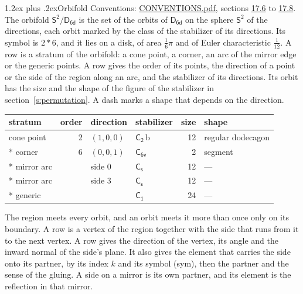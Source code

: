 \documentclass[10pt,a4paper]{article}
\makeatletter
\renewcommand\section{\@startsection{section}{1}{\z@}{-3ex plus -1ex minus -.2ex}%
  {1.2ex plus .2ex}{\normalfont\large\sffamily\bfseries\color{parttitle}}}
\numberwithin{equation}{section}
\newcommand{\grp}[1]{\mathsf{#1}}
\newcommand{\orbname}[1]{#1}
\newcommand{\clsletter}[1]{\,{\scriptsize\color{black!55}#1}}
\newcommand{\dirvec}[3]{(#1, #2, #3)}
\newcommand{\twosphere}{\mathsf{S}^{2}}
\makeatother
\begin{document}
\section{Orbifold}\label{s:orbifold}
Conventions: \href{../../CONVENTIONS.pdf}{CONVENTIONS.pdf}, sections \href{../../CONVENTIONS.pdf\#conv.17.6}{17.6} to \href{../../CONVENTIONS.pdf\#conv.17.8}{17.8}.
The orbifold $\twosphere/\grp{D_{6d}}$ is the set of the orbits of $\grp{D_{6d}}$ on the sphere $\twosphere$ of the directions, each orbit marked by the class of the stabilizer of its directions. Its symbol is $\orbname{2{\ast}6}$, and it lies on a disk, of area $\tfrac{1}{6}\pi$ and of Euler characteristic $\tfrac{1}{12}$.
\leavevmode\label{n:head.stratum}\label{n:head.order.point}\label{n:head.direction}\label{n:head.stabilizer}\label{n:head.size.orbit}\label{n:head.shape}A row is a stratum of the orbifold: a cone point, a corner, an arc of the mirror edge or the generic points. A row gives the order of its points, the direction of a point or the side of the region along an arc, and the stabilizer of its directions. Its orbit has the size and the shape of the figure of the stabilizer in section~\ref{s:permutation}. A dash marks a shape that depends on the direction.
{\small\setlength{\tabcolsep}{4pt}\begin{longtable}{@{}lrllrl@{}}\toprule
stratum & order & direction & stabilizer & size & shape\\\midrule\endhead
\bottomrule\endfoot\endlastfoot
cone point & 2 & $\dirvec{1}{0}{0}$ & \href{C2.pdf}{$\grp{C_{2}}$}\clsletter{b} & 12 & regular dodecagon\\*
corner & 6 & $\dirvec{0}{0}{1}$ & \href{C6v.pdf}{$\grp{C_{6v}}$} & 2 & segment\\*
mirror arc &  & side 0 & \href{C1v.pdf}{$\grp{C_{s}}$} & 12 & ---\\*
mirror arc &  & side 3 & \href{C1v.pdf}{$\grp{C_{s}}$} & 12 & ---\\*
generic &  &  & \href{C1.pdf}{$\grp{C_{1}}$} & 24 & ---\\
\bottomrule\end{longtable}}
\leavevmode\label{n:head.vertex.region}\label{n:head.angle}\label{n:head.normal.side}\label{n:head.partner}\label{n:head.sense}The region meets every orbit, and an orbit meets it more than once only on its boundary. A row is a vertex of the region together with the side that runs from it to the next vertex. A row gives the direction of the vertex, its angle and the inward normal of the side's plane. It also gives the element that carries the side onto its partner, by its index $k$ and its symbol (sym), then the partner and the sense of the gluing. A side on a mirror is its own partner, and its element is the reflection in that mirror.
\end{document}

